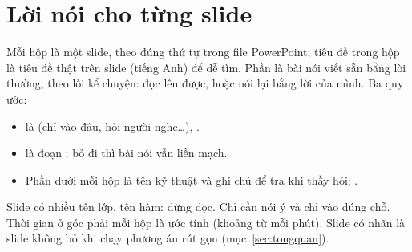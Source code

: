 \section{Lời nói cho từng slide}\label{sec:slides}
Mỗi hộp là một slide, theo đúng thứ tự trong file PowerPoint; tiêu đề trong hộp là tiêu đề thật trên slide (tiếng Anh) để dễ tìm.
Phần  là bài nói viết sẵn bằng lời thường, theo lối kể chuyện: đọc lên được, hoặc nói lại bằng lời của mình. Ba quy ước:
\begin{itemize}
\item {} là  (chỉ vào đâu, hỏi người nghe\ldots), .
\item {} là đoạn ; bỏ đi thì bài nói vẫn liền mạch.
\item Phần  dưới mỗi hộp là tên kỹ thuật và ghi chú để tra khi thầy hỏi; .
\end{itemize}
Slide có nhiều tên lớp, tên hàm: đừng đọc. Chỉ cần nói ý và chỉ vào đúng chỗ. Thời gian ở góc phải mỗi hộp là ước tính (khoảng \wpm{} từ mỗi phút). Slide có nhãn  là slide không bỏ khi chạy phương án rút gọn (mục~\ref{sec:tongquan}).

